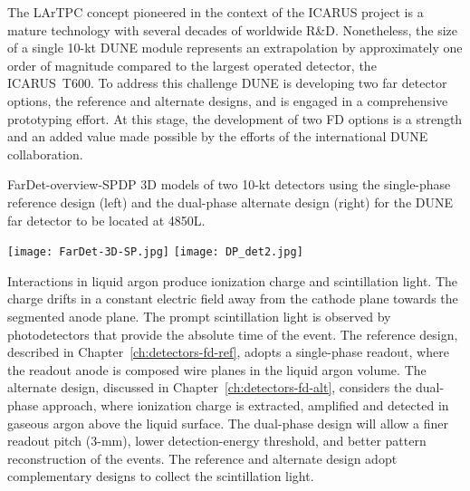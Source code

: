 The LArTPC concept pioneered in the context of the ICARUS project is
a mature technology with several decades of worldwide R\&D.
Nonetheless, the size of a single 10-kt DUNE module represents an
extrapolation by approximately one order of magnitude compared to the
largest operated detector, the ICARUS~T600. To address this challenge
DUNE is developing two far detector options, the reference and
alternate designs, and is engaged in a comprehensive prototyping
effort. At this stage, the development of two FD options is a strength
and an added value made possible by the efforts of the international DUNE collaboration.

\begin{cdrfigure}{FarDet-overview-SPDP}
{3D models of two 10-kt detectors using the single-phase reference design (left) 
and the dual-phase alternate design (right) for the DUNE far detector to be 
located at 4850L.}
\centering
\begin{minipage}[b]{1.0\textwidth}
\begin{center}
\texttt{[image: FarDet-3D-SP.jpg]}
\texttt{[image: DP\_det2.jpg]}
\end{center}
\end{minipage}
\end{cdrfigure}

Interactions in liquid argon produce ionization charge and
scintillation light.  The charge drifts in a constant electric field
away from the cathode plane towards the segmented anode plane.  The
prompt scintillation light is observed by photodetectors that provide
the absolute time of the event.  The reference design, described in
Chapter~\ref{ch:detectors-fd-ref}, adopts a single-phase readout,
where the readout anode is composed wire planes in the liquid argon
volume.  The alternate design, discussed in
Chapter~\ref{ch:detectors-fd-alt}, considers the dual-phase approach,
where ionization charge is extracted, amplified and detected in
gaseous argon above the liquid surface.  The dual-phase design will
allow a finer readout pitch (3-mm), lower detection-energy threshold,
and better pattern reconstruction of the events.  The reference and
alternate design adopt complementary designs to collect the
scintillation light.

